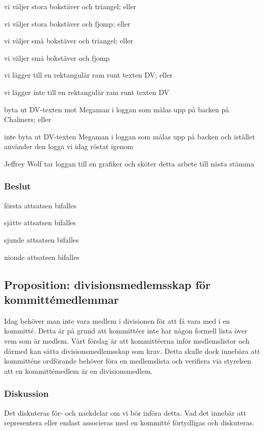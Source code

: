 \documentclass[protokoll]{dvd}
\begin{document}
\begin{attsatser}
    \item vi väljer stora bokstäver och triangel; eller
    \item vi väljer stora bokstäver och fjomp; eller
    \item vi väljer små bokstäver och triangel; eller
    \item vi väljer små bokstäver och fjomp
    \item vi lägger till en rektangulär ram runt texten DV; eller
    \item vi lägger inte till en rektangulär ram runt texten DV
    \item byta ut DV-texten mot Megaman i loggan som målas upp på backen på Chalmers; eller
    \item inte byta ut DV-texten Megaman i loggan som målas upp på backen och istället använder den logga vi idag röstat igenom
    \item Jeffrey Wolf tar loggan till en grafiker och sköter detta arbete till nästa stämma
\end{attsatser}

\subsubsection*{Beslut}

\begin{attsatser}
    \item första attsatsen bifalles
    \item sjätte attsatsen bifalles
    \item sjunde attsatsen bifalles
    \item nionde attsatsen bifalles
\end{attsatser}

\subsection{Proposition: divisionsmedlemsskap för kommittémedlemmar}
Idag behöver man inte vara medlem i divisionen för att få vara med i en kommitté. Detta är på grund att kommittéer inte har någon formell lista över vem som är medlem.
Vårt förslag är att kommittéerna inför medlemslistor och därmed kan sätta divisionsmedlemsskap som krav.
Detta skulle dock innebära att kommitténs ordförande behöver föra en medlemslista och verifiera via styrelsen att en kommittémedlem är en divisionsmedlem.

\subsubsection*{Diskussion}
Det diskuteras för- och nackdelar om vi bör införa detta.
Vad det innebär att representera eller endast associeras med en kommitté förtydligas och diskuteras.
\end{document}
